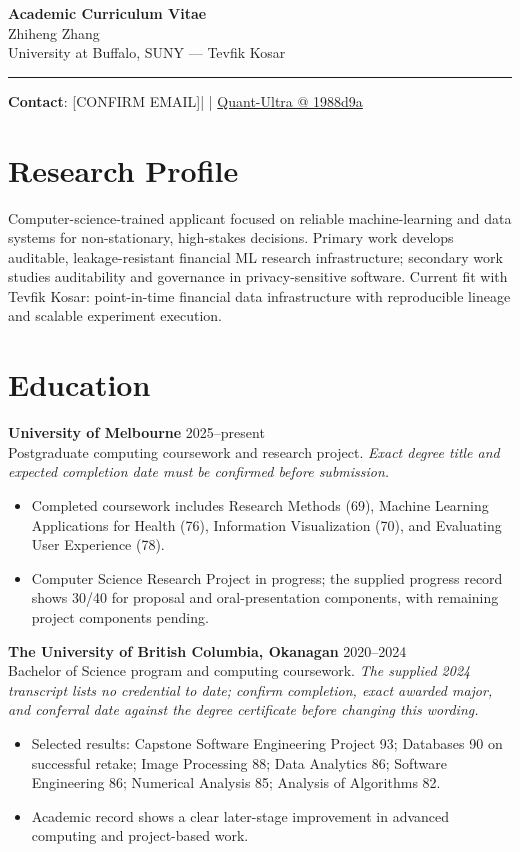 \documentclass[11pt]{article}
\makeatletter
\newcommand{\ApplicantName}{Zhiheng Zhang}
\newcommand{\ApplicantEmail}{[CONFIRM EMAIL]}
\newcommand{\ApplicantPhone}{[CONFIRM PHONE]}
\newcommand{\ApplicantGitHub}{\href{https://github.com/zhiheng-zhang-Mera/Quant-Ultra/tree/1988d9a8530da91a8158de864d098ea869098923}{Quant-Ultra @ 1988d9a}}
\makeatother
\begin{document}
\begin{center}
{\LARGE\bfseries Academic Curriculum Vitae}\\[0.25em]
{\large \ApplicantName}\\
University at Buffalo, SUNY --- Tevfik Kosar
\end{center}
\vspace{0.35em}\hrule\vspace{0.65em}

\textbf{Contact}: \ApplicantEmail\quad | \quad \ApplicantPhone\quad | \quad \ApplicantGitHub

\section*{Research Profile}
Computer-science-trained applicant focused on reliable machine-learning and data systems for non-stationary, high-stakes decisions. Primary work develops auditable, leakage-resistant financial ML research infrastructure; secondary work studies auditability and governance in privacy-sensitive software. Current fit with Tevfik Kosar: point-in-time financial data infrastructure with reproducible lineage and scalable experiment execution.

\section*{Education}
\textbf{University of Melbourne} \hfill 2025--present\\
Postgraduate computing coursework and research project. \textit{Exact degree title and expected completion date must be confirmed before submission.}
\begin{itemize}
\item Completed coursework includes Research Methods (69), Machine Learning Applications for Health (76), Information Visualization (70), and Evaluating User Experience (78).
\item Computer Science Research Project in progress; the supplied progress record shows 30/40 for proposal and oral-presentation components, with remaining project components pending.
\end{itemize}

\textbf{The University of British Columbia, Okanagan} \hfill 2020--2024\\
Bachelor of Science program and computing coursework. \textit{The supplied 2024 transcript lists no credential to date; confirm completion, exact awarded major, and conferral date against the degree certificate before changing this wording.}
\begin{itemize}
\item Selected results: Capstone Software Engineering Project 93; Databases 90 on successful retake; Image Processing 88; Data Analytics 86; Software Engineering 86; Numerical Analysis 85; Analysis of Algorithms 82.
\item Academic record shows a clear later-stage improvement in advanced computing and project-based work.
\end{itemize}
\end{document}
